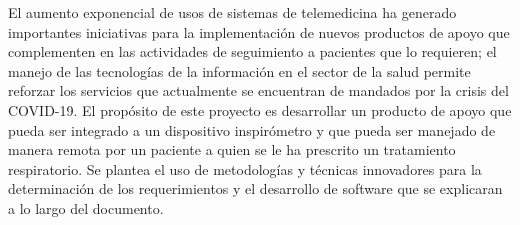 
El aumento exponencial de usos de sistemas de telemedicina ha generado importantes iniciativas para la implementaci\'on de nuevos productos de apoyo que complementen en las actividades de seguimiento a pacientes que lo requieren; el manejo de las tecnolog\'ias de la informaci\'on en el sector de la salud permite reforzar los servicios que actualmente se encuentran de mandados por la crisis del COVID-19. El prop\'osito de este proyecto es desarrollar un producto de apoyo que pueda ser integrado a un dispositivo inspir\'ometro y que pueda ser manejado de manera remota por un paciente a quien se le ha prescrito un tratamiento respiratorio. Se plantea el uso de metodolog\'ias y t\'ecnicas innovadores para la determinaci\'on de los requerimientos y el desarrollo de software que se explicaran a lo largo del documento.

